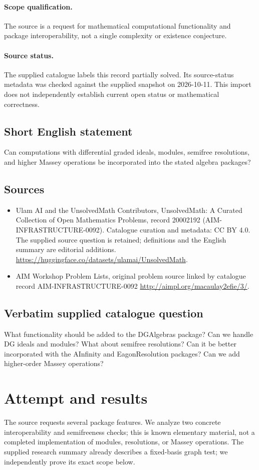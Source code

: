 \documentclass[11pt]{article}
\begin{document}
\paragraph{Scope qualification.}
The source is a request for mathematical computational functionality and package interoperability, not a single complexity or existence conjecture.
\paragraph{Source status.}
The supplied catalogue labels this record partially solved. Its source-status metadata was checked against the supplied snapshot on 2026-10-11. This import does not independently establish current open status or mathematical correctness.
\subsection{Short English statement}
Can computations with differential graded ideals, modules, semifree resolutions, and higher Massey operations be incorporated into the stated algebra packages?
\subsection{Sources}
\begin{itemize}
\item[S1] Ulam AI and the UnsolvedMath Contributors, UnsolvedMath: A Curated Collection of Open Mathematics Problems, record 20002192 (AIM-INFRASTRUCTURE-0092). Catalogue curation and metadata: CC BY 4.0. The supplied source question is retained; definitions and the English summary are editorial additions.
\url{https://huggingface.co/datasets/ulamai/UnsolvedMath}.
\item[S2] AIM Workshop Problem Lists, original problem source linked by catalogue record AIM-INFRASTRUCTURE-0092
\url{http://aimpl.org/macaulay2efie/3/}.
\end{itemize}
\subsection{Verbatim supplied catalogue question}
What functionality should be added to the DGAlgebras package? Can we handle DG ideals and modules? What about semifree resolutions? Can it be better incorporated with the AInfinity and EagonResolution packages? Can we add higher-order Massey operations?

\section{Attempt and results}
The source requests several package features. We analyze two concrete
interoperability and semifreeness checks; this is known elementary material,
not a completed implementation of modules, resolutions, or Massey operations.
The supplied research summary already describes a fixed-basis graph test;
we independently prove its exact scope below.
\end{document}
